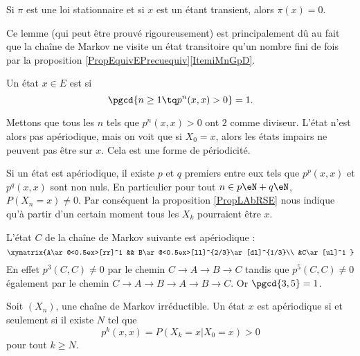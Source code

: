 \begin{lemma}
    Si \( \pi\) est une loi stationnaire et si \( x\) est un étant transient, alors \( \pi(x)=0\).
\end{lemma}
Ce lemme (qui peut être prouvé rigoureusement) est principalement dû au fait que la chaîne de Markov ne visite un état transitoire qu'un nombre fini de fois par la proposition \ref{PropEquivEPrecuequiv}\ref{ItemiMnGpD}.

\begin{definition}  \label{DefCxvOaT}
    Un état \( x\in E\) est  si
    \begin{equation}
        \pgcd\{ n\geq 1\tq p^n(x,x)>0 \}=1.
    \end{equation}
\end{definition}
Mettons que tous les \( n\) tels que \( p^n(x,x)>0\) ont \( 2\) comme diviseur. L'état n'est alors pas apériodique, mais on voit que si \( X_0=x\), alors les états impairs ne peuvent pas être sur \( x\). Cela est une forme de périodicité.

Si un état est apériodique, il existe \( p\) et \( q\) premiers entre eux tels que \( p^p(x,x)\) et \( p^q(x,x)\) sont non nuls. En particulier pour tout \( n\in p\eN+q\eN\), \( P(X_n=x)\neq 0\). Par conséquent la proposition \ref{PropLAbRSE} nous indique qu'à partir d'un certain moment tous les \( X_k\) pourraient être \( x\).

L'état \( C\) de la chaîne de Markov suivante est apériodique :
\begin{equation}
    \xymatrix{%
    A\ar@<0.5ex>[rr]^1  && B\ar@<0.5ex>[ll]^{2/3}\ar[dl]^{1/3}\\
    &C\ar[ul]^1
       }
\end{equation}
En effet \( p^3(C,C)\neq 0\) par le chemin \( C\to A\to B\to C\) tandis que \( p^5(C,C)\neq 0\) également par le chemin \( C\to A\to B\to A\to B\to C\). Or \( \pgcd\{ 3,5 \}=1\).

\begin{proposition}     \label{PropSaOysS}
    Soit \( (X_n)\), une chaîne de Markov irréductible. Un état \( x\) est apériodique si et seulement si il existe \( N\) tel que
    \begin{equation}
        p^k(x,x)=P(X_k=x|X_0=x)>0
    \end{equation}
    pour tout \( k\geq N\).
\end{proposition}

